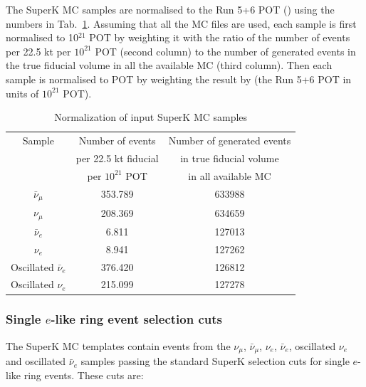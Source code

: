 The SuperK MC samples are normalised to the Run 5+6 POT (\TotalPot) using the numbers in Tab.~\ref{tab:SKMCNormalisation}. 
Assuming that all the MC files are used, each sample is first normalised to 10$^{21}$ POT by weighting it 
with the ratio of the number of events per 22.5 kt per $10^{21}$ POT (second column) to the number of generated 
events in the true fiducial volume in all the available MC (third column). Then each sample is 
normalised to \TotalPot{} POT by weighting the result by \TotalPotPerTwentyOne (the Run 5+6 POT in units of $10^{21}$ POT). 
\begin{table}
\centering
\begin{tabular}{| c | c | c |}
\hline
Sample                        &  Number of events     & Number of generated events \\
                              & per 22.5 kt fiducial  & in true fiducial volume    \\
                              & per $10^{21}$ POT     & in all available MC        \\  
\hline             
$\bar{\nu}_{\mu}$             &     353.789           &       633988               \\
$\nu_{\mu}$                   &     208.369           &       634659               \\
$\bar{\nu}_{e}$               &      6.811            &       127013               \\
$\nu_{e}$                     &      8.941            &       127262               \\
Oscillated $\bar{\nu}_{e}$    &     376.420           &       126812               \\
Oscillated $\nu_{e}$          &     215.099           &       127278               \\
\hline
\end{tabular}
\caption{
  Normalization of input SuperK MC samples \cite{SuperkMC14a}
}
\label{tab:SKMCNormalisation}
\end{table}

\subsubsection {Single $e$-like ring event selection cuts}
\label{sec:mc_templates:1Re_cuts}

The SuperK MC templates contain events from the 
$\nu_{\mu}$, $\bar{\nu}_{\mu}$, $\nu_{e}$, $\bar{\nu}_{e}$, oscillated $\nu_{e}$ and oscillated $\bar{\nu}_{e}$ 
 samples passing the standard SuperK selection cuts for single $e$-like ring events.
These cuts are:

